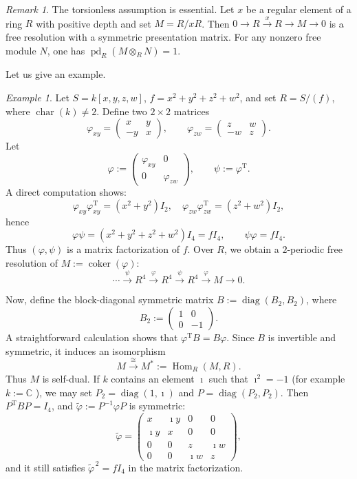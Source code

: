 \documentclass[11.05pt,a4paper]{amsart}
\theoremstyle{definition}
\theoremstyle{remark}
\newtheorem{remark}[theorem]{Remark}\newtheorem{fact}[theorem]{Fact}
\newtheorem{example}[theorem]{Example}
\newcommand{\pd}{\operatorname{pd}}
\begin{document}
\begin{remark}
	The torsionless assumption is essential. Let $x$ be a regular element of a ring $R$ with positive depth and set $M=R/xR$. Then
	\(
	0\to R \xrightarrow{x} R \to M \to 0
	\)
	is a free resolution with a symmetric presentation matrix. For any nonzero free module $N$, one has $\pd_R(M\otimes_R N)=1$.
\end{remark}
Let us give an example.
\begin{example}
	Let $S = k[x, y, z, w]$, $f = x^{2} + y^{2} + z^{2} + w^{2}$, and set $R = S/(f)$, where $\operatorname{char}(k) \neq 2$.
	Define two $2 \times 2$ matrices
	\[
	\varphi_{xy} = \begin{pmatrix}
	x & y \\
	-y & x
	\end{pmatrix}, \qquad
	\varphi_{zw} = \begin{pmatrix}
	z & w \\
	-w & z
	\end{pmatrix}.
	\]
	Let
	\[
	\varphi := \begin{pmatrix}
	\varphi_{xy} & 0 \\
	0 & \varphi_{zw}
	\end{pmatrix},
	\qquad
	\psi := \varphi^{\mathrm{T}}.
	\]
	A direct computation shows:
	\[
	\varphi_{xy}\varphi_{xy}^{\mathrm{T}} = (x^{2} + y^{2})I_{2}, \quad
	\varphi_{zw}\varphi_{zw}^{\mathrm{T}} = (z^{2} + w^{2})I_{2},
	\]
	hence
	\[
	\varphi\psi = (x^{2}+y^{2}+z^{2}+w^{2})I_{4} = f I_{4},
	\qquad
	\psi\varphi = f I_{4}.
	\]
	Thus $(\varphi, \psi)$ is a matrix factorization of $f$.
	Over $R$, we obtain a $2$-periodic free resolution of $M := \operatorname{coker}(\varphi)$:
	\[
	\cdots \xrightarrow{\psi} R^{4} \xrightarrow{\varphi} R^{4} \xrightarrow{\psi} R^{4} \xrightarrow{\varphi} M \longrightarrow 0.
	\]
	
	Now, define the block-diagonal symmetric matrix $B := \operatorname{diag}(B_{2},B_{2})$, where
	\[
	B_{2} := \begin{pmatrix}
	1 & 0 \\
	0 & -1
	\end{pmatrix}.
	\]
	A straightforward calculation shows that $\varphi^{\mathrm{T}}B = B\varphi$.
	Since $B$ is invertible and symmetric, it induces an isomorphism
	\[
	M \stackrel{\cong}{\longrightarrow} M^{*} := \operatorname{Hom}_{R}(M,R).
	\]
	Thus $M$ is self-dual.
	If $k$ contains an element $\imath$ such that $\imath^{2} = -1$ (for example $k:=\mathbb{C}$  ), we may set $P_{2} = \operatorname{diag}(1,\imath)$ and $P = \operatorname{diag}(P_{2},P_{2})$.
	Then $P^{\mathrm{T}}BP = I_{4}$, and $\widetilde{\varphi} := P^{-1}\varphi P$ is symmetric:
	\[
	\widetilde{\varphi} =
	\begin{pmatrix}
	x & \imath y & 0 & 0 \\
	\imath y & x   & 0 & 0 \\
	0 & 0 & z & \imath w \\
	0 & 0 & \imath w & z
	\end{pmatrix},
	\]
	and it still satisfies $\widetilde{\varphi}^{\,2}=f I_{4}$ in the matrix factorization.
\end{example}
\end{document}
